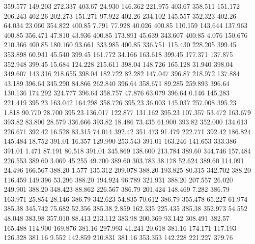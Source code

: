  359.577  149.203  272.337       403.67
  24.930  146.362  221.975       403.67
 358.511  151.172  206.243       402.26
 202.273  151.271   97.922       402.26
 234.102  145.557  352.323       402.26
  64.034   23.060  354.822       400.85
   7.791   77.928   40.026       400.85
 110.159  143.644  137.963       400.85
 356.471   47.810   43.936       400.85
 173.891   45.639  343.607       400.85
   4.076  150.676  210.366       400.85
 180.160   93.661  333.985       400.85
 336.751  115.430  228.205       399.45
 353.898   60.941   45.540       399.45
 161.772   34.166  163.618       399.45
 177.371  137.875  352.948       399.45
  15.684  124.228  215.611       398.04
 148.726  165.128   31.940       398.04
 349.607  143.316  218.655       398.04
 182.722   82.282  147.047       396.87
 218.972  137.884   43.189       396.64
 345.290   84.866  262.840       396.64
 358.671   89.285  259.893       396.64
 130.136  174.292  324.777       396.64
 358.757   47.876   63.079       396.64
   0.146  145.283  221.419       395.23
 163.042  164.298  358.726       395.23
  36.003  145.037  257.008       395.23
   1.818   90.770   28.700       395.23
 136.017  122.877  131.162       395.23
 107.357   53.472  163.679       393.82
  83.800   28.579  336.666       393.82
  18.486   73.435   61.900       393.82
 352.000  134.613  226.671       392.42
  16.528   83.315   74.014       392.42
 351.473   91.479  222.771       392.42
 186.824  145.484   18.752       391.01
  16.357  129.990  253.543       391.01
 163.246  141.653  333.386       391.01
   1.471   87.191   80.518       391.01
 345.869  138.600  213.784       389.60
 344.746  157.484  226.553       389.60
   3.069   45.255   49.700       389.60
 303.783   38.178   52.624       389.60
 114.091   24.496  166.567       388.20
   1.577  135.312  209.078       388.20
 193.825   80.315  342.702       388.20
 116.459  149.396   53.296       388.20
 194.924   96.789  321.931       388.20
 207.557   26.020  249.901       388.20
 348.423   88.862  226.567       386.79
 201.424  148.469    7.282       386.79
 163.971   25.854   28.146       386.79
 342.623   54.835   70.612       386.79
 355.478   65.227   61.974       385.38
 345.742   75.682   52.356       385.38
   2.859  162.335  225.435       385.38
 352.973   54.552   48.048       383.98
 357.010   88.413  213.112       383.98
 200.369   93.142  308.491       382.57
 165.488  114.900  169.876       381.16
 297.993   41.241   20.618       381.16
 174.171  117.193  126.328       381.16
   9.552  142.859  210.831       381.16
 353.353  142.228  221.227       379.76
